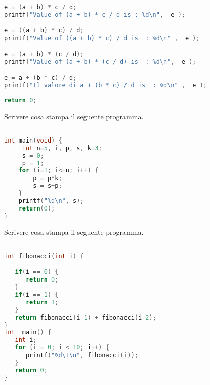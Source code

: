 \documentclass[addpoints,11pt]{exam}
\begin{document}
\begin{questions}
\begin{minipage}[t]{0.4\linewidth}
\begin{lstlisting}[language=C]
e = (a + b) * c / d; 
printf("Value of (a + b) * c / d is : %d\n",  e );

e = ((a + b) * c) / d; 
printf("Value of ((a + b) * c) / d is  : %d\n" ,  e );

e = (a + b) * (c / d); 
printf("Value of (a + b) * (c / d) is  : %d\n",  e );

e = a + (b * c) / d;  
printf("Il valore di a + (b * c) / d is  : %d\n" ,  e );
  
return 0;

\end{lstlisting}
\end{minipage}
\begin{minipage}[t]{0.6\linewidth}
       \makeemptybox{310pt}
\end{minipage}



\question[4]
Scrivere cosa stampa il seguente programma.

\begin{minipage}[t]{0.4\linewidth}
\begin{lstlisting}[language=C]

int main(void) {
     int n=5, i, p, s, k=3;
     s = 0;
     p = 1;
    for (i=1; i<=n; i++) {
        p = p*k;
        s = s+p;
    }
    printf("%d\n", s);
    return(0);
}


\end{lstlisting}
\end{minipage}
\begin{minipage}[t]{0.6\linewidth}
       \makeemptybox{100pt}
\end{minipage}

\question[4]
Scrivere cosa stampa il seguente programma.

\begin{minipage}[t]{0.4\linewidth}
\begin{lstlisting}[language=C]

int fibonacci(int i) {

   if(i == 0) {
      return 0;
   }
   if(i == 1) {
      return 1;
   }
   return fibonacci(i-1) + fibonacci(i-2);
}
int  main() {
   int i;
   for (i = 0; i < 10; i++) {
      printf("%d\t\n", fibonacci(i));
   }
   return 0;
}

\end{lstlisting}
\end{minipage}
\begin{minipage}[t]{0.6\linewidth}
       \makeemptybox{150pt}
\end{minipage}


\end{questions}
\end{document}
